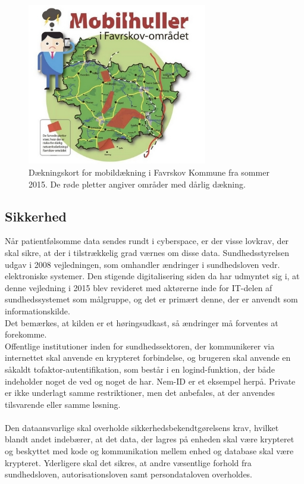 \begin{figure}[H]
\centering
\includegraphics[width=0.7\textwidth]{Figurer/daekningskort.png}
\caption{\label{fig:dkort}Dækningskort for mobildækning i Favrskov Kommune fra sommer 2015. De røde pletter angiver områder med dårlig dækning\cite{daekningskort}.}
\end{figure}
\subsection{Sikkerhed}
Når patientfølsomme data sendes rundt i cyberspace, er der visse lovkrav, der skal sikre, at der i tilstrækkelig grad værnes om disse data.
Sundhedsstyrelsen udgav i 2008 vejledningen, som omhandler ændringer i sundhedsloven vedr. elektroniske systemer. Den stigende digitalisering siden da har udmyntet sig i, at denne vejledning i 2015 blev revideret med aktørerne inde for IT-delen af sundhedssystemet som målgruppe, og det er primært denne, der er anvendt som informationskilde\cite{vogi}.\\Det bemærkes, at kilden er et høringsudkast, så ændringer må forventes at forekomme.\\
Offentlige institutioner inden for sundhedssektoren, der kommunikerer via internettet skal anvende en krypteret forbindelse, og brugeren skal anvende en såkaldt tofaktor-autentifikation, som består i en logind-funktion, der både indeholder noget de ved og noget de har. Nem-ID er et eksempel herpå. Private er ikke underlagt samme restriktioner, men det anbefales, at der anvendes tilsvarende eller samme løsning.\\ \\
Den dataansvarlige skal overholde sikkerhedsbekendtgørelsens krav, hvilket blandt andet indebærer, at det data, der lagres på enheden skal være krypteret og beskyttet med kode og kommunikation mellem enhed og database skal være krypteret\cite{shbekendt}. Yderligere skal det sikres, at andre væsentlige forhold fra sundhedsloven, autorisationsloven samt persondataloven overholdes. 

